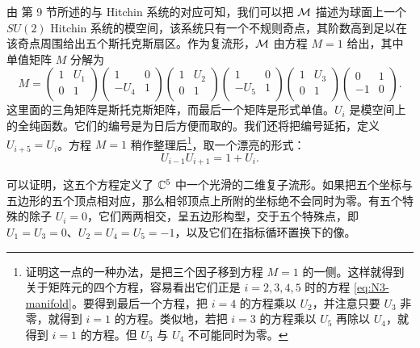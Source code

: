 由 \cite{Gaiotto:2009hg} 第 9 节所述的与 Hitchin 系统的对应可知，我们可以把 $\mathcal{M}$ 描述为球面上一个 $SU(2)$ Hitchin 系统的模空间，该系统只有一个不规则奇点，其阶数高到足以在该奇点周围给出五个斯托克斯扇区。作为复流形，$\mathcal{M}$ 由方程 $M=1$ 给出，其中单值矩阵 $M$ 分解为
\begin{equation}
M  = \begin{pmatrix} 1 & U_1 \\  0  & 1 \\ \end{pmatrix}\begin{pmatrix} 1 & 0 \\  - U_4  & 1 \\ \end{pmatrix}\begin{pmatrix} 1 & U_2 \\  0  & 1 \\ \end{pmatrix}\begin{pmatrix} 1 & 0 \\  - U_5  & 1 \\ \end{pmatrix}\begin{pmatrix} 1 & U_3 \\  0  & 1 \\ \end{pmatrix}\begin{pmatrix} 0 & 1 \\  - 1  & 0 \\ \end{pmatrix}.
\end{equation}
这里面的三角矩阵是斯托克斯矩阵，而最后一个矩阵是形式单值。$U_i$ 是模空间上的全纯函数。它们的编号是为日后方便而取的。我们还将把编号延拓，定义 $U_{i+5}=U_i$。方程 $M=1$ 稍作整理后\footnote{证明这一点的一种办法，是把三个因子移到方程 $M=1$ 的一侧。这样就得到关于矩阵元的四个方程，容易看出它们正是 $i=2,3,4,5$ 时的方程 \eqref{eq:N3-manifold}。要得到最后一个方程，把 $i=4$ 的方程乘以 $U_2$，并注意只要 $U_3$ 非零，就得到 $i=1$ 的方程。类似地，若把 $i=3$ 的方程乘以 $U_5$ 再除以 $U_4$，就得到 $i=1$ 的方程。但 $U_3$ 与 $U_4$ 不可能同时为零。}，取一个漂亮的形式：
\begin{equation}\label{eq:N3-manifold}
U_{i-1} U_{i+1} = 1+U_i.
\end{equation}

可以证明，这五个方程定义了 $\mathbb{C}^5$ 中一个光滑的二维复子流形。如果把五个坐标与五边形的五个顶点相对应，那么相邻顶点上所附的坐标绝不会同时为零。有五个特殊的除子 $U_i=0$，它们两两相交，呈五边形构型，交于五个特殊点，即 $U_1=U_3=0$、$U_2=U_4=U_5=-1$，以及它们在指标循环置换下的像。

